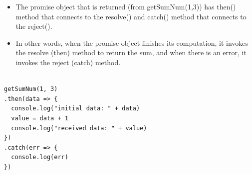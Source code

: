 \begin{frame}[fragile]{}

\begin{itemize}
	\item The promise object that is returned (from getSumNum(1,3)) has then() method that connects to the resolve() and catch() method that connects to the reject(). 
	\item In other words, when the promise object finishes its computation, it invokes the resolve (then) method to return the sum, and when there is an error, it invokes the reject (catch) method. 
\end{itemize}

\begin{Code}{}%
\begin{lstlisting}[firstnumber=1, label=glabels, xleftmargin=0pt, basicstyle=\scriptsize]% 

getSumNum(1, 3)
.then(data => {
  console.log("initial data: " + data)
  value = data + 1 
  console.log("received data: " + value)
})
.catch(err => {
  console.log(err)
})
\end{lstlisting}%
\end{Code}%

\end{frame}